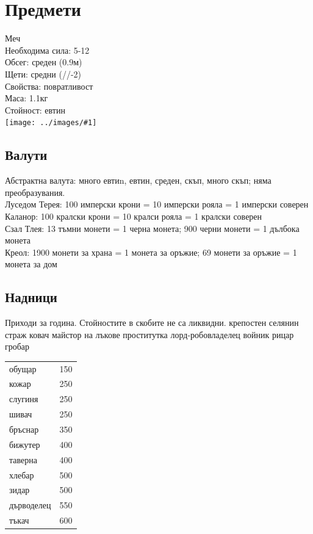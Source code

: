\section{Предмети}


\newcommand{\weapon}[8]
{
\begin{multicols}{2}
\noindent #2 \\
Необходима сила: #3  \\
Обсег: #4  \\
Щети: #5  \\
Свойства: #6  \\
Маса: #7  \\
Стойност: #8  \\
\texttt{[image: ../images/\#1]}~
\end{multicols}
}

\weapon{sword}{Меч}{5-12}{среден (0.9м)}{средни (//-2)}{повратливост}{1.1кг}{евтин}


\subsection{Валути}
Абстрактна валута: много евтиn, евтин, среден, скъп, много скъп; няма преобразувания.  \\
Луседом Терея: 100 имперски крони = 10 имперски рояла = 1 имперски соверен             \\
Каланор: 100 кралски крони = 10 кралси рояла = 1 кралски соверен                       \\
Сзал Тлея: 13 тъмни монети = 1 черна монета; 900 черни монети = 1 дълбока монета       \\
Креол: 1900 монети за храна = 1 монета за оръжие; 69 монети за оръжие = 1 монета за дом

\subsection{Надници}
Приходи за година. Стойностите в скобите не са ликвидни.
крепостен селянин
страж
ковач
майстор на лъкове
проститутка
лорд-робовладелец
войник
рицар
гробар

\begin{tabular}{p{3cm} | p{2cm}}
обущар      & 150   \\
кожар       & 250   \\
слугиня     & 250   \\
шивач       & 250   \\
бръснар     & 350   \\
бижутер     & 400   \\
таверна     & 400   \\
хлебар      & 500   \\
зидар       & 500   \\
дърводелец  & 550   \\
тъкач       & 600   \\

\end{tabular}

